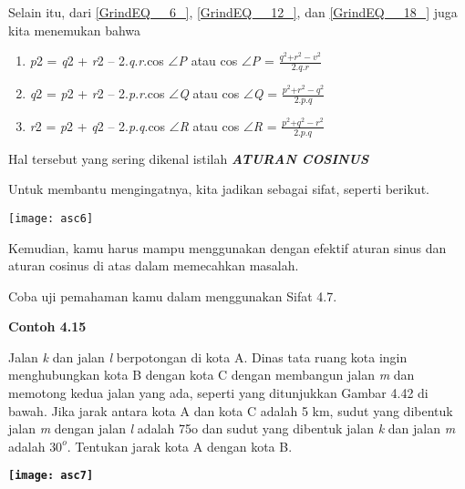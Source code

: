 \documentclass[11pt,fleqn]{book} %
\begin{document}
\begin{myEnumerate}
\begin{itemize}
\noindent 

\noindent Selain itu, dari \eqref{GrindEQ__6_}, \eqref{GrindEQ__12_}, dan \eqref{GrindEQ__18_} juga kita menemukan bahwa

\noindent 

\begin{enumerate}
\item  \textit{p}2 = \textit{q}2 + \textit{r}2 -- 2.\textit{q}.\textit{r}.cos $\mathrm{\angle }$\textit{P }atau cos $\mathrm{\angle }$\textit{P }= $\frac{q^2{+r}^2-v^2}{2.q.r}$

\item  \textit{q}2 = \textit{p}2 + \textit{r}2 -- 2.\textit{p}.\textit{r}.cos $\mathrm{\angle}$\textit{Q }atau cos $\mathrm{\angle}$\textit{Q }= $\frac{p^2{+r}^2-q^2}{2.p.q}$

\item  \textit{r}2 = \textit{p}2 + \textit{q}2 -- 2.\textit{p}.\textit{q}.cos $\mathrm{\angle}$\textit{R }atau cos $\mathrm{\angle}$\textit{R }= $\frac{p^2{+q}^2-r^2}{2.p.q}$
\end{enumerate}

\noindent \eject 

\noindent Hal tersebut yang sering dikenal istilah \textbf{\textit{ATURAN COSINUS}}

\noindent Untuk membantu mengingatnya, kita jadikan sebagai sifat, seperti berikut.\textbf{\textit{}}

\noindent \texttt{[image: asc6]}

\noindent 

\noindent Kemudian, kamu harus mampu menggunakan dengan efektif aturan sinus dan aturan cosinus di atas dalam memecahkan masalah.

\noindent Coba uji pemahaman kamu dalam menggunakan Sifat 4.7.

\noindent \textbf{Contoh 4.15}

\noindent Jalan \textit{k }dan jalan \textit{l }berpotongan di kota A. Dinas tata ruang kota ingin menghubungkan kota B dengan kota C dengan membangun jalan \textit{m }dan memotong kedua jalan yang ada, seperti yang ditunjukkan Gambar 4.42 di bawah. Jika jarak antara kota A dan kota C adalah 5 km, sudut yang dibentuk jalan \textit{m }dengan jalan \textit{l }adalah 75o dan sudut yang dibentuk jalan \textit{k }dan jalan \textit{m} adalah $30^o$. Tentukan jarak kota A dengan kota B.

\textbf{\texttt{[image: asc7]}}


\end{itemize}
\end{myEnumerate}
\end{document}

